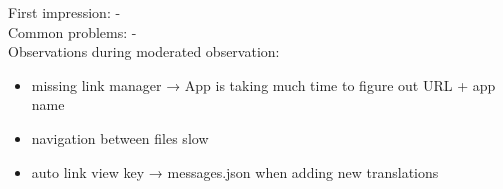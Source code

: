 First impression: -\\
Common problems: -\\
Observations during moderated observation:
\begin{itemize}[nosep]
  \item missing link manager → App is taking much time to figure out URL + app name
  \item navigation between files slow
  \item auto link view key → messages.json when adding new translations
\end{itemize}
